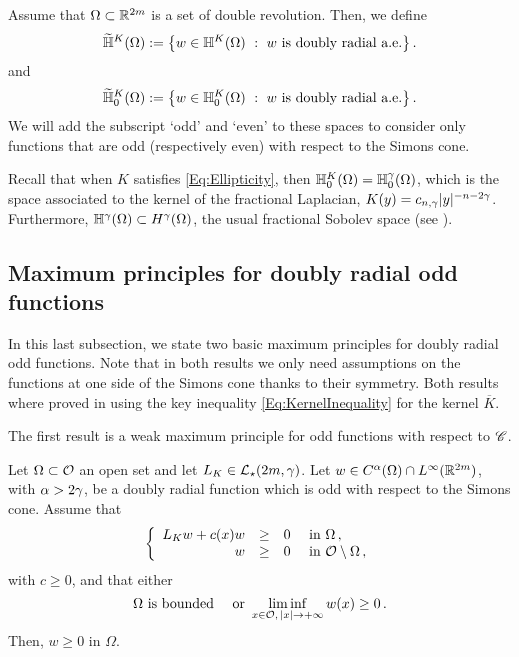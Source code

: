 Assume that $\Omega \subset \mathbb{R}^{2m}$ is a set of double revolution. Then, we define
$$
\widetilde{\mathbb{H}}^K(\Omega) := \left \{ w \in \mathbb{H}^K(\Omega) \ : \ w \textrm{ is doubly radial a.e.} \right \}.
$$
and
$$
\widetilde{\mathbb{H}}^K_0(\Omega) := \left \{ w \in \mathbb{H}^K_0(\Omega) \ : \ w \textrm{ is doubly radial a.e.} \right \}.
$$
We will add the subscript `odd' and `even' to these spaces to consider only functions that are odd (respectively even) with respect to the Simons cone.

Recall that when $K$ satisfies \eqref{Eq:Ellipticity}, then $\mathbb{H}^K_0 (\Omega) = \mathbb{H}^\gamma_0 (\Omega)$, which is the space associated to the kernel of the fractional Laplacian, $K(y) = c_{n,\gamma}|y|^{-n-2\gamma}$. Furthermore, $\mathbb{H}^\gamma(\Omega) \subset H^\gamma(\Omega)$, the usual fractional Sobolev space (see \cite{HitchhikerGuide,CozziPassalacqua}). 


\subsection{Maximum principles for doubly radial odd functions}
\label{Subsec:MaxPrinciples}

In this last subsection, we state two basic maximum principles for doubly radial odd functions. Note that in both results we only need assumptions on the functions at one side of the Simons cone thanks to their symmetry. Both results where proved in \cite{FelipeSanz-Perela:IntegroDifferentialI} using the key inequality \eqref{Eq:KernelInequality} for the kernel $\overline{K}$.

The first result is a weak maximum principle for odd functions with respect to $\mathscr{C}$.

\begin{proposition}
	\label{Prop:WeakMaximumPrincipleForOddFunctions} Let $\Omega \subset \mathcal{O}$ an open set and let $L_K  \in \mathcal{L}_\star (2m,  \gamma)$.  Let $w\in C^{\alpha}(\Omega)\cap L^\infty(\mathbb{R}^{2m})$, with $\alpha > 2\gamma$, be a doubly radial function which is odd with respect to the Simons cone.  Assume that
	$$
	\left\{\begin{array}{rcll}
	L_K w + c(x) w & \geq & 0 & \text{ in } \Omega\,,\\
	w & \geq & 0 & \text{ in } \mathcal{O} \setminus \Omega\,,
	\end{array} \right.
	$$
	with $c \geq 0$, and that either
	$$
	\Omega \text{ is bounded} \quad \text{ or } \liminf_{x \in \mathcal{O},\,|x|\to +\infty} w(x) \geq 0\,.
	$$
	Then, $w \geq 0$ in $\Omega$.
\end{proposition}


